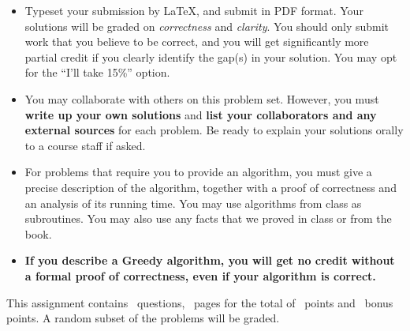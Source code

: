 \begin{itemize} 
\item Typeset your submission by \LaTeX, and submit in PDF
  format. Your solutions will be graded on \emph{correctness} and
  \emph{clarity}. You should only submit work that you believe to be
  correct, and you will get significantly more partial credit if you
  clearly identify the gap(s) in your solution. You may opt for the
  ``I’ll take 15\%'' option.
\item You may collaborate with others on this problem set.  However,
  you must \textbf{{write up your own solutions}} and \textbf{{list
      your collaborators and any external sources}} for each
  problem. Be ready to explain your solutions orally to a course staff
  if asked.
\item For problems that require you to provide an algorithm, you must
  give a precise description of the algorithm, together with a proof
  of correctness and an analysis of its running time. You may use
  algorithms from class as subroutines. You may also use any facts
  that we proved in class or from the book.
\item \textbf{If you describe a Greedy algorithm, you will get no
    credit without a formal proof of correctness, even if your
    algorithm is correct.}
\end{itemize}

\noindent This assignment contains \numquestions\ questions,
\numpages\ pages for the total of \numpoints \ points and
\numbonuspoints\ bonus points. A random subset of the problems will be
graded. \medskip

